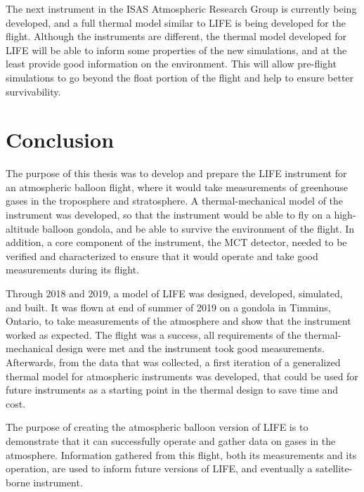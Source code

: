 The next instrument in the ISAS Atmospheric Research Group is currently being developed, and a full thermal model similar to LIFE is being developed for the flight. Although the instruments are different, the thermal model developed for LIFE will be able to inform some properties of the new simulations, and at the least provide good information on the environment. This will allow pre-flight simulations to go beyond the float portion of the flight and help to ensure better survivability.

\section{Conclusion}
The purpose of this thesis was to develop and prepare the LIFE instrument for an atmospheric balloon flight, where it would take measurements of greenhouse gases in the troposphere and stratosphere. A thermal-mechanical model of the instrument was developed, so that the instrument would be able to fly on a high-altitude balloon gondola, and be able to survive the environment of the flight. In addition, a core component of the instrument, the MCT detector, needed to be verified and characterized to ensure that it would operate and take good measurements during its flight.

Through 2018 and 2019, a model of LIFE was designed, developed, simulated, and built. It was flown at end of summer of 2019 on a gondola in Timmins, Ontario, to take measurements of the atmosphere and show that the instrument worked as expected. The flight was a success, all requirements of the thermal-mechanical design were met and the instrument took good measurements. Afterwards, from the data that was collected, a first iteration of a generalized thermal model for atmospheric instruments was developed, that could be used for future instruments as a starting point in the thermal design to save time and cost.

The purpose of creating the atmospheric balloon version of LIFE is to demonstrate that it can successfully operate and gather data on gases in the atmosphere. Information gathered from this flight, both its measurements and its operation, are used to inform future versions of LIFE, and eventually a satellite-borne instrument. 